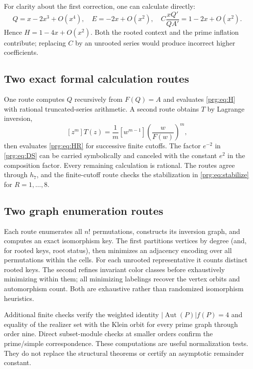 \documentclass[11pt,letterpaper]{article}
\numberwithin{equation}{section}
\theoremstyle{definition}\newtheorem{definition}[theorem]{Definition}
\theoremstyle{remark}\newtheorem{remark}[theorem]{Remark}
\DeclareMathOperator{\Aut}{Aut}
\begin{document}
For clarity about the first correction, one can calculate directly:
\[
 Q=x-2x^3+O(x^4),\quad E=-2x+O(x^2),\quad
 C\frac{xQ'}{QA'}=1-2x+O(x^2).
\]
Hence $H=1-4x+O(x^2)$. Both the rooted context and the prime
inflation contribute; replacing $C$ by an unrooted series would
produce incorrect higher coefficients.

\subsection{Two exact formal calculation routes}
One route computes $Q$ recursively from $F(Q)=A$ and evaluates
\eqref{prg:eq:H} with rational truncated-series arithmetic. A second
route obtains $T$ by Lagrange inversion,
\begin{equation}\label{prg:eq:lagrange}
 [z^m]T(z)=\frac1m[w^{m-1}]\left(\frac{w}{F(w)}\right)^m,
\end{equation}
then evaluates \eqref{prg:eq:HR} for successive finite cutoffs.
The factor $e^{-2}$ in \eqref{prg:eq:DS} can be carried symbolically
and canceled with the constant $e^2$ in the composition factor.
Every remaining calculation is rational. The routes agree through
$h_7$, and the finite-cutoff route checks the stabilization in
\eqref{prg:eq:stabilize} for $R=1,\ldots,8$.

\subsection{Two graph enumeration routes}
Each route enumerates all $n!$ permutations, constructs its inversion
graph, and computes an exact isomorphism key. The first partitions
vertices by degree (and, for rooted keys, root status), then minimizes
an adjacency encoding over all permutations within the cells.
For each unrooted representative it counts distinct rooted keys.
The second refines invariant color classes before exhaustively
minimizing within them; all minimizing labelings recover the
vertex orbits and automorphism count. Both are exhaustive rather
than randomized isomorphism heuristics.

Additional finite checks verify the weighted identity
$|\Aut(P)|f(P)=4$ and equality of the realizer set with the Klein
orbit for every prime graph through order nine. Direct subset-module
checks at smaller orders confirm the prime/simple correspondence.
These computations are useful normalization tests. They do not
replace the structural theorems or certify an asymptotic remainder
constant.
\end{document}
